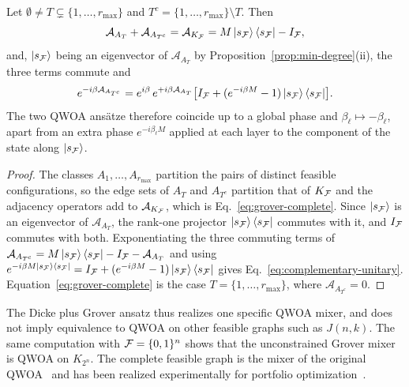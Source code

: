 \begin{proposition}
\label{prop:complementary}
Let $\emptyset\neq T\subsetneq\{1,\dots,r_{\max}\}$ and
$T^{c}=\{1,\dots,r_{\max}\}\setminus T$. Then
\begin{equation}
    \mathcal{A}_{A_T}+\mathcal{A}_{A_{T^{c}}}
    =
    \mathcal{A}_{K_{\mathcal{F}}}
    =
    M\ket{s_{\mathcal{F}}}\bra{s_{\mathcal{F}}}-I_{\mathcal{F}} ,
    \label{eq:complementary-sum}
\end{equation}
and, $\ket{s_{\mathcal{F}}}$ being an eigenvector of $\mathcal{A}_{A_T}$ by
Proposition~\ref{prop:min-degree}(ii), the three terms commute and
\begin{equation}
    e^{-i\beta\mathcal{A}_{A_{T^{c}}}}
    =
    e^{i\beta}\,e^{+i\beta\mathcal{A}_{A_T}}
    \bigl[I_{\mathcal{F}}+(e^{-i\beta M}-1)\ket{s_{\mathcal{F}}}\bra{s_{\mathcal{F}}}\bigr] .
    \label{eq:complementary-unitary}
\end{equation}
The two QWOA ans\"atze therefore coincide up to a global phase and
$\beta_\ell\mapsto-\beta_\ell$, apart from an extra phase $e^{-i\beta_\ell M}$
applied at each layer to the component of the state along $\ket{s_{\mathcal{F}}}$.
\end{proposition}

\begin{proof}
The classes $A_1,\dots,A_{r_{\max}}$ partition the pairs of distinct feasible
configurations, so the edge sets of $A_T$ and $A_{T^{c}}$ partition that of
$K_{\mathcal{F}}$ and the adjacency operators add to
$\mathcal{A}_{K_{\mathcal{F}}}$, which is Eq.~\eqref{eq:grover-complete}. Since
$\ket{s_{\mathcal{F}}}$ is an eigenvector of $\mathcal{A}_{A_T}$, the rank-one
projector $\ket{s_{\mathcal{F}}}\bra{s_{\mathcal{F}}}$ commutes with it, and
$I_{\mathcal{F}}$ commutes with both. Exponentiating the three commuting terms of
$\mathcal{A}_{A_{T^{c}}}=M\ket{s_{\mathcal{F}}}\bra{s_{\mathcal{F}}}-I_{\mathcal{F}}-\mathcal{A}_{A_T}$
and using
$e^{-i\beta M\ket{s_{\mathcal{F}}}\bra{s_{\mathcal{F}}}}
 =I_{\mathcal{F}}+(e^{-i\beta M}-1)\ket{s_{\mathcal{F}}}\bra{s_{\mathcal{F}}}$
gives Eq.~\eqref{eq:complementary-unitary}. Equation~\eqref{eq:grover-complete}
is the case $T=\{1,\dots,r_{\max}\}$, where $\mathcal{A}_{A_{T^{c}}}=0$.
\end{proof}

The Dicke plus Grover ansatz thus realizes one specific QWOA mixer, and does
not imply equivalence to QWOA on other feasible graphs such as $J(n,k)$. The
same computation with $\mathcal{F}=\{0,1\}^n$ shows that the unconstrained Grover mixer
is QWOA on $K_{2^n}$. The complete feasible graph is the mixer of the original
QWOA~\cite{Marsh2019,Marsh2020,Slate2021} and has been realized
experimentally for portfolio optimization~\cite{Qu2024}.

